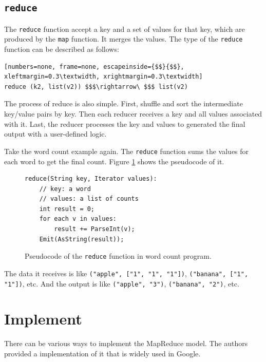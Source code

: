 \documentclass[10pt]{article}
\begin{document}
\subsection{\texttt{reduce}}

The \texttt{reduce} function accept a key and a set of values for that key, which are produced by the \texttt{map} function. It merges the values. The type of the \texttt{reduce} function can be described as follows:

\begin{lstlisting}[numbers=none, frame=none, escapeinside={$$}{$$}, xleftmargin=0.3\textwidth, xrightmargin=0.3\textwidth]
reduce (k2, list(v2)) $$$\rightarrow\ $$$ list(v2)
\end{lstlisting}

The process of reduce is also simple. First, shuffle and sort the intermediate key/value pairs by key. Then each reducer receives a key and all values associated with it. Last, the reducer processes the key and values to generated the final output with a user-defined logic.

Take the word count example again. The \texttt{reduce} function sums the values for each word to get the final count. Figure \ref{fig:reduce} shows the pseudocode of it.

\begin{figure}[H]
\centering

\begin{lstlisting}[xleftmargin=0.29\textwidth, xrightmargin=0.28\textwidth]
reduce(String key, Iterator values):
    // key: a word
    // values: a list of counts
    int result = 0;
    for each v in values:
        result += ParseInt(v);
    Emit(AsString(result));
\end{lstlisting}

\caption{Pseudocode of the \texttt{reduce} function in word count program.}
\label{fig:reduce}
\end{figure}

The data it receives is like \texttt{("apple", ["1", "1", "1"])}, \texttt{("banana", ["1", "1"])}, etc. And the output is like \texttt{("apple", "3")}, \texttt{("banana", "2")}, etc.

\section{Implement}

There can be various ways to implement the MapReduce model. The authors provided a implementation of it that is widely used in Google.
\end{document}
